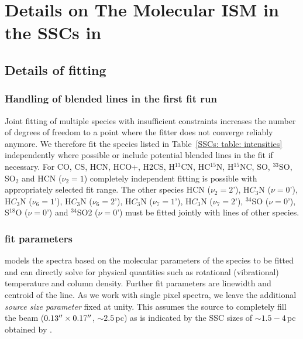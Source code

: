 
\chapter{Details on The Molecular ISM in the SSCs in }
\label{appendix: SSCs}


\section{Details of \xclass fitting}
\label{appendix: SSCs: xclass}

\subsection{Handling of blended lines in the first fit run}
Joint fitting of multiple species with insufficient constraints increases the number of degrees of freedom to a point where the fitter does not converge reliably anymore. 
We therefore fit the species listed in Table~\ref{SSCs: table: intensities} independently where possible or include potential blended lines in the fit if necessary. 
For CO, CS, HCN, HCO+, H2CS, H$^{13}$CN, HC$^{15}$N, H$^{15}$NC, SO, $^{33}$SO, SO$_2$ and HCN ($\nu_2=1$) completely independent fitting is possible with appropriately selected fit range. The other species HCN ($\nu_2=2$'), H$C_3$N ($\nu=0$'),
H$C_3$N ($\nu_6=1$'), H$C_3$N ($\nu_6=2$'), H$C_3$N ($\nu_7=1$'), H$C_3$N ($\nu_7=2$'), $^{34}$SO ($\nu=0$'), S$^{18}$O ($\nu=0$') and $^{34}$SO2 ($\nu=0$') must be fitted jointly with lines of other species.

\subsection{\xclass fit parameters}
\xclass models the spectra based on the molecular parameters of the species to be fitted and can directly solve for physical quantities such as rotational (vibrational) temperature and column density. Further fit parameters are linewidth and centroid of the line. As we work with single pixel spectra, we leave the additional \emph{source size parameter} fixed at unity. This assumes the source to completely fill the beam ($0.13^{\prime\prime} \times 0.17^{\prime\prime}$, $\sim 2.5$\,pc) as is indicated by the SSC sizes of $\sim 1.5-4$\,pc obtained by .


